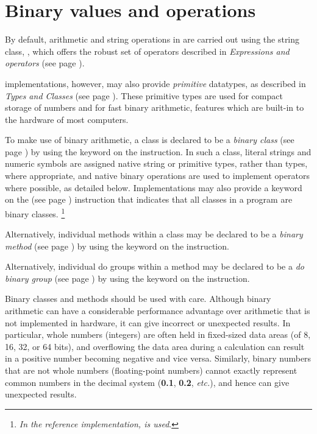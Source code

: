 \section{Binary values and operations}\label{refbinary}
 
By default, arithmetic and string operations in \nr{} are carried out
using the \nr{} string class, , which offers the robust
set of operators described in \emph{Expressions and operators} (see page \pageref{refexpr}).
 
\nr{} implementations, however, may also provide \emph{primitive}
datatypes, as described in  \emph{Types and Classes} (see page \pageref{refprims}). These primitive types are used for compact storage
of numbers and for fast binary arithmetic, features which are built-in
to the hardware of most computers.
 
To make use of binary arithmetic, a class is declared to be a
 \emph{binary class} (see page \pageref{refbincla})  by using the 
keyword on the  instruction.
In such a class, literal strings and numeric symbols are assigned native
string or primitive types, rather than \nr{} types, where appropriate,
and native binary operations are used to implement operators where
possible, as detailed below.
Implementations may also provide a keyword on the
  (see page \pageref{refoptions})  instruction that indicates that
all classes in a program are binary classes.
\footnote{
\emph{In the reference implementation,  is
used}.
}
 
Alternatively, individual methods within a class may be declared to
be a  \emph{binary method} (see page \pageref{refbinme})  by using the 
keyword on the  instruction.

Alternatively, individual do groups within a method may be declared to
be a  \emph{do binary group} (see page \pageref{refdo})  by using the 
keyword on the  instruction.
 
Binary classes and methods should be used with care.  Although binary
arithmetic can have a considerable performance advantage over
arithmetic that is not implemented in hardware, it can give incorrect
or unexpected results.
In particular, whole numbers (integers) are often held in fixed-sized
data areas (of 8, 16, 32, or 64 bits), and overflowing the data area
during a calculation can result in a positive number becoming negative
and vice versa.
Similarly, binary numbers that are not whole numbers (floating-point
numbers) cannot exactly represent common numbers in the decimal system
(\textbf{0.1}, \textbf{0.2}, \emph{etc.}), and hence can give unexpected
results.

